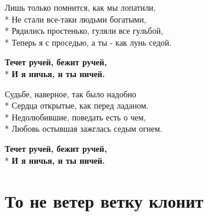 \medskip

\begin{minipage}{\linewidth}
Лишь только помнится, как мы лопатили,\\*
Не стали все-таки людьми богатыми,\\*
Рядились простенько, гуляли все гульбой,\\*
Теперь я с проседью, а ты - как лунь седой.\\
\end{minipage}\par\medskip\nobreak

\medskip

\begin{minipage}{\linewidth}
\hspace*{1.5em}\textbf{Течет ручей, бежит ручей,}\\*
\hspace*{1.5em}\textbf{И я ничья, и ты ничей.}\\
\end{minipage}\par\medskip\nobreak

\medskip

\begin{minipage}{\linewidth}
Судьбе, наверное, так было надобно\\*
Сердца открытые, как перед ладаном.\\*
Недолюбившие, поведать есть о чем,\\*
Любовь остывшая зажглась седым огнем.\\
\end{minipage}\par\medskip\nobreak

\medskip

\begin{minipage}{\linewidth}
\hspace*{1.5em}\textbf{Течет ручей, бежит ручей,}\\*
\hspace*{1.5em}\textbf{И я ничья, и ты ничей.}\\
\end{minipage}

\vspace{\fill}\newpage

\section{То не ветер ветку клонит}
\label{song:То_не_ветер_ветку_клонит}

